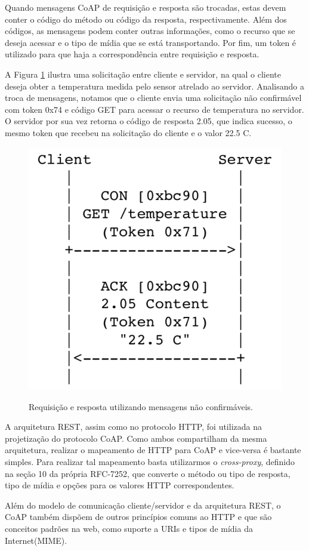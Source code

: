 Quando mensagens CoAP de requisição e resposta são trocadas, estas devem conter o código do método ou código da resposta, respectivamente.
Além dos códigos, as mensagens podem conter outras informações, como o recurso que se deseja acessar e o tipo de mídia que se está transportando.
Por fim, um token é utilizado para que haja a correspondência entre requisição e resposta.

A Figura \ref{fig:fig4} ilustra uma solicitação entre cliente e servidor, na qual o cliente deseja obter a temperatura medida pelo sensor atrelado ao servidor.
Analisando a troca de mensagens, notamos que o cliente envia uma solicitação não confirmável com token 0x74 e código GET para acessar o recurso de temperatura no servidor.
O servidor por sua vez retorna o código de resposta 2.05, que indica sucesso, o mesmo token que recebeu na solicitação do cliente e o valor 22.5 C.

\begin{figure}[htb!]
    \centering\includegraphics[height=.4\textwidth]{fig4.png} 
    \caption [Requisição e resposta utilizando mensagens não confirmáveis]
    {\label{fig:fig4} Requisição e resposta utilizando mensagens não confirmáveis.} \cite{rfc7252}
\end{figure}

A arquitetura REST, assim como no protocolo HTTP\cite{rfc2616}, foi utilizada na projetização do protocolo CoAP.
Como ambos compartilham da mesma arquitetura, realizar o mapeamento de HTTP para CoAP e vice-versa é bastante simples.
Para realizar tal mapeamento basta utilizarmos o \textit{cross-proxy}, definido na seção 10 da própria RFC-7252\cite{rfc7252},
que converte o método ou tipo de resposta, tipo de mídia e opções para os valores HTTP correspondentes.

Além do modelo de comunicação cliente/servidor e da arquitetura REST, o CoAP também dispõem de outros princípios comuns ao HTTP e que são conceitos padrões na web,
como suporte a URIs\cite{rfc3986} e tipos de mídia da Internet(MIME)\cite{rfc2046}.

